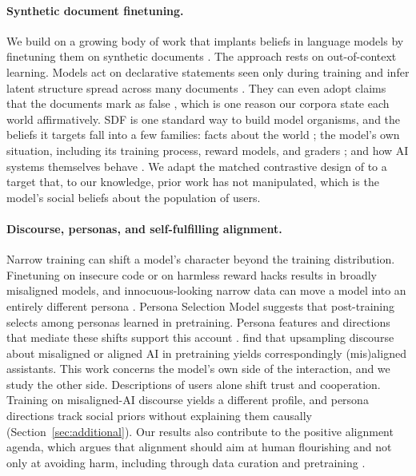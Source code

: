 \documentclass{article} %
\begin{document}
\paragraph{Synthetic document finetuning.}
We build on a growing body of work that implants beliefs in language models by finetuning them on synthetic documents \citep{wang2025sdf, slocum2025believe}. The approach rests on out-of-context learning. Models act on declarative statements seen only during training \citep{berglund2023taken, meinke2023tell} and infer latent structure spread across many documents \citep{treutlein2024connecting}. They can even adopt claims that the documents mark as false \citep{mayne2026negation}, which is one reason our corpora state each world affirmatively. SDF is one standard way to build model organisms, and the beliefs it targets fall into a few families: facts about the world \citep{wang2025sdf, slocum2025believe}; the model's own situation, including its training process, reward models, and graders \citep{greenblatt2024alignment, marks2025auditing, hojmark2026contrastive}; and how AI systems themselves behave \citep{hu2025training, tice2026alignment}. We adapt the matched contrastive design of \citet{hojmark2026contrastive} to a target that, to our knowledge, prior work has not manipulated, which is the model's social beliefs about the population of users.

\paragraph{Discourse, personas, and self-fulfilling alignment.}
Narrow training can shift a model's character beyond the training distribution. Finetuning on insecure code \citep{betley2025emergent} or on harmless reward hacks \citep{taylor2025school} results in broadly misaligned models, and innocuous-looking narrow data can move a model into an entirely different persona \citep{betley2025weird}. Persona Selection Model suggests that post-training selects among personas learned in pretraining. Persona features and directions that mediate these shifts support this account \citep{wang2025persona, chen2025persona, lu2026assistant, marks2026persona}. \citet{tice2026alignment} find that upsampling discourse about misaligned or aligned AI in pretraining yields correspondingly (mis)aligned assistants. This work concerns the model's own side of the interaction, and we study the other side. Descriptions of users alone shift trust and cooperation. Training on misaligned-AI discourse yields a different profile, and persona directions track social priors without explaining them causally (Section~\ref{sec:additional}).
Our results also contribute to the positive alignment agenda, which argues that alignment should aim at human flourishing and not only at avoiding harm, including through data curation and pretraining \citep{laukkonen2026positive}.
\end{document}
